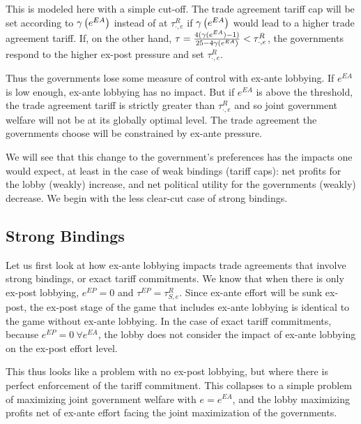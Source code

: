 This is modeled here with a simple cut-off. The trade agreement tariff cap will be set according to $\gamma\left(e^{EA}\right)$ instead of at $\tau^R_{\cdot,e}$ if $\gamma\left(e^{EA}\right)$ would lead to a higher trade agreement tariff. If, on the other hand, $\tau = \frac{4(\gamma(e^{EA})-1)}{25-4\gamma(e^{EA})} < \tau^R_{\cdot,e}$, the governments respond to the higher ex-post pressure and set $\tau^R_{\cdot,e}$.

Thus the governments lose some measure of control with ex-ante lobbying. If $e^{EA}$ is low enough, ex-ante lobbying has no impact. But if $e^{EA}$ is above the threshold, the trade agreement tariff is strictly greater than $\tau^R_{\cdot,e}$ and so joint government welfare will not be at its globally optimal level. The trade agreement the governments choose will be constrained by ex-ante pressure.

We will see that this change to the government's preferences has the impacts one would expect, at least in the case of weak bindings (tariff caps): net profits for the lobby (weakly) increase, and net political utility for the governments (weakly) decrease. We begin with the less clear-cut case of strong bindings.

\subsection{Strong Bindings}
Let us first look at how ex-ante lobbying impacts trade agreements that involve strong bindings, or exact tariff commitments. We know that when there is only ex-post lobbying, $e^{EP} =0$ and $\tau^{EP} = \tau^R_{S,e}$. Since ex-ante effort will be sunk ex-post, the ex-post stage of the game that includes ex-ante lobbying is identical to the game without ex-ante lobbying. In the case of exact tariff commitments, because $e^{EP} = 0 \ \forall e^{EA}$, the lobby does not consider the impact of ex-ante lobbying on the ex-post effort level.

This thus looks like a problem with no ex-post lobbying, but where there is perfect enforcement of the tariff commitment. This collapses to a simple problem of maximizing joint government welfare with $e=e^{EA}$, and the lobby maximizing profits net of ex-ante effort facing the joint maximization of the governments.

